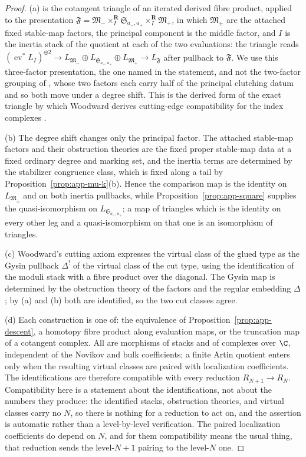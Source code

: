 \begin{proof}
(a) is the cotangent triangle of an iterated derived fibre product, applied to
the presentation
\(\mathfrak F=\mathfrak M_-\times^{\mathbf R}_{I}
\mathfrak S_{a_-,a_+}\times^{\mathbf R}_{I}\mathfrak M_+\), in which
\(\mathfrak M_\pm\) are the attached fixed stable-map factors, the principal
component is the middle factor, and \(I\) is the inertia stack of the
quotient at each of the two evaluations: the triangle reads
\((\operatorname{ev}^*L_I)^{\oplus2}\to L_{\mathfrak M_-}\oplus
L_{\mathfrak S_{a_-,a_+}}\oplus L_{\mathfrak M_+}\to
L_{\mathfrak F}\) after pullback to \(\mathfrak F\).  We use this
three-factor presentation, the one named in the statement, and not the
two-factor grouping of \cite[equation~(57)]{WoodwardQKIII}, whose two factors
each carry half of the principal clutching datum and so both move under a
degree shift.  This is the derived form
of the exact triangle by which Woodward derives cutting-edge compatibility for
the index complexes \cite[Equation~(35) and Section~7.1]{WoodwardQKIII}.

(b)  The degree shift changes only the principal factor.  The attached
stable-map factors and their obstruction theories are the fixed proper
stable-map data at a fixed ordinary degree and marking set, and the inertia
terms are determined by the stabilizer congruence class, which is fixed along a
tail by Proposition~\ref{prop:app-mu-k}(b).  Hence the comparison map is the
identity on \(L_{\mathfrak M_\pm}\) and on both inertia pullbacks, while
Proposition~\ref{prop:app-square} supplies the quasi-isomorphism on
\(L_{\mathfrak S_{a_-,a_+}}\); a map of triangles which is the identity on
every other leg and a quasi-isomorphism on that one is an isomorphism of
triangles.

(c)  Woodward's cutting axiom expresses the virtual class of the glued type as
the Gysin pullback \(\Delta^!\) of the virtual class of the cut type, using the
identification of the moduli stack with a fibre product over the diagonal.  The
Gysin map is determined by the obstruction theory of the factors and the
regular embedding \(\Delta\); by (a) and (b) both are identified, so the two
cut classes agree.

(d)  Each construction is one of: the equivalence of
Proposition~\ref{prop:app-descent}, a homotopy fibre product along evaluation
maps, or the truncation map of a cotangent complex.  All are morphisms of
stacks and of complexes over \(\C\), independent of the Novikov and bulk
coefficients; a finite Artin quotient enters only when the resulting virtual
classes are paired with localization coefficients.  The identifications are
therefore compatible with every reduction \(R_{N+1}\to R_N\).  Compatibility
here is a statement about the identifications, not about the numbers they
produce: the identified stacks, obstruction theories, and virtual classes carry
no \(N\), so there is nothing for a reduction to act on, and the assertion is
automatic rather than a level-by-level verification.  The paired
localization coefficients do depend on \(N\), and for them compatibility means
the usual thing, that reduction sends the level-\(N+1\) pairing to the
level-\(N\) one.
\end{proof}

